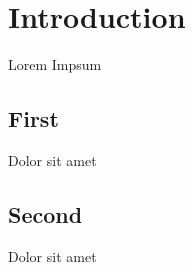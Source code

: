 \section{Introduction}
Lorem Impsum \cite{knuthwebsite}
\subsection{First}
Dolor sit amet
\subsection{Second}
Dolor sit amet